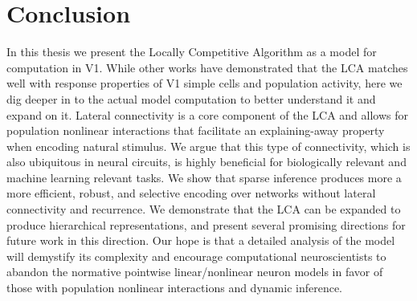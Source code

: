 \chapter{Conclusion}
In this thesis we present the Locally Competitive Algorithm as a model for computation in V1. While other works \parencite{zhu2013visual,olshausen1997sparse,vinje2000sparse} have demonstrated that the LCA matches well with response properties of V1 simple cells and population activity, here we dig deeper in to the actual model computation to better understand it and expand on it. Lateral connectivity is a core component of the LCA and allows for population nonlinear interactions that facilitate an explaining-away property when encoding natural stimulus. We argue that this type of connectivity, which is also ubiquitous in neural circuits, is highly beneficial for biologically relevant and machine learning relevant tasks. We show that sparse inference produces more a more efficient, robust, and selective encoding over networks without lateral connectivity and recurrence. We demonstrate that the LCA can be expanded to produce hierarchical representations, and present several promising directions for future work in this direction. Our hope is that a detailed analysis of the model will demystify its complexity and encourage computational neuroscientists to abandon the normative pointwise linear/nonlinear neuron models in favor of those with population nonlinear interactions and dynamic inference.